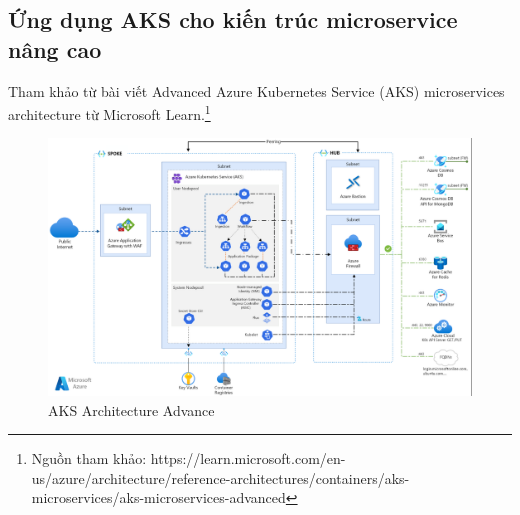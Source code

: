 \subsection {Ứng dụng AKS cho kiến trúc microservice nâng cao}
\noindent Tham khảo từ bài viết Advanced Azure Kubernetes Service (AKS) microservices architecture từ Microsoft Learn.\footnote{Nguồn tham khảo: https://learn.microsoft.com/en-us/azure/architecture/reference-architectures/containers/aks-microservices/aks-microservices-advanced}
\begin{figure}[H]
    \centering
    \includegraphics[scale=0.6]{images/hieu/chap-2/aks-architecture-advance.png}
    \caption{AKS Architecture Advance}
\end{figure}
